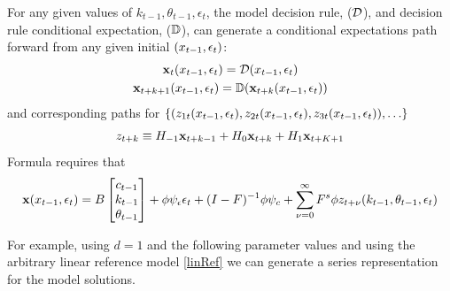 \documentclass[12pt]{article}
\begin{document}
For any given values of $k_{t-1},\theta_{t-1}, \epsilon_t$, the model decision rule, ($\mathcal{D}$), and decision rule conditional expectation, ($\mathbb{D}$), can generate a conditional expectations path forward from  any given initial $(x_{t-1},\epsilon_t)$:
\begin{gather*}
  \mathbf{x}_t({x_{t-1},\epsilon_t})=\mathcal{D}({x_{t-1},\epsilon_t})\\
  \mathbf{x}_{t+k+1}({x_{t-1},\epsilon_t})=\mathbb{D}(\mathbf{x}_{t+k}({x_{t-1},\epsilon_t}))
\end{gather*}
and corresponding paths for $\{(z_{1t}(x_{t-1},\epsilon_t), z_{2t}(x_{t-1},\epsilon_t), z_{3t}(x_{t-1},\epsilon_t)),\ldots\}$
\begin{gather*}
  z_{t+k} \equiv H_{-1} \mathbf{x}_{t+k-1} +  H_0 \mathbf{x}_{t+k} +  H_1 \mathbf{x}_{t+K+1} 
\end{gather*}
Formula  requires that
\begin{gather*}
\mathbf{x}({x_{t-1},\epsilon_t})=
B   \begin{bmatrix}
c_{t-1}\\
k_{t-1}\\
\theta_{t-1}
  \end{bmatrix}  + \phi \psi_\epsilon\epsilon_t + (I - F)^{-1} \phi \psi_c + \sum_{{\nu}=0}^\infty F^s \phi z_{t+{\nu}}(k_{t-1},\theta_{t-1}, \epsilon_t) 
\end{gather*}

For example, using $d=1$ and the following parameter values and using the arbitrary linear reference model \eqref{linRef} we can generate a series representation for the model solutions.
\end{document}
